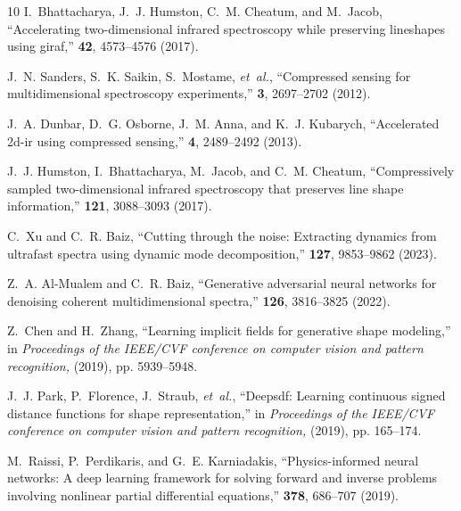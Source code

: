 \documentclass{optica-article}
\begin{document}
\begin{thebibliography}{10}
I.~Bhattacharya, J.~J. Humston, C.~M. Cheatum, and M.~Jacob, \enquote{Accelerating two-dimensional infrared spectroscopy while preserving lineshapes using giraf,} {\protect{}} \textbf{42}, 4573--4576 (2017).

J.~N. Sanders, S.~K. Saikin, S.~Mostame, \emph{et~al.}, \enquote{Compressed sensing for multidimensional spectroscopy experiments,} {\protect{}} \textbf{3}, 2697--2702 (2012).

J.~A. Dunbar, D.~G. Osborne, J.~M. Anna, and K.~J. Kubarych, \enquote{Accelerated 2d-ir using compressed sensing,} {\protect{}} \textbf{4}, 2489--2492 (2013).

J.~J. Humston, I.~Bhattacharya, M.~Jacob, and C.~M. Cheatum, \enquote{Compressively sampled two-dimensional infrared spectroscopy that preserves line shape information,} {\protect{}} \textbf{121}, 3088--3093 (2017).

C.~Xu and C.~R. Baiz, \enquote{Cutting through the noise: Extracting dynamics from ultrafast spectra using dynamic mode decomposition,} {\protect{}} \textbf{127}, 9853--9862 (2023).

Z.~A. Al-Mualem and C.~R. Baiz, \enquote{Generative adversarial neural networks for denoising coherent multidimensional spectra,} {\protect{}} \textbf{126}, 3816--3825 (2022).

Z.~Chen and H.~Zhang, \enquote{Learning implicit fields for generative shape modeling,} in \emph{Proceedings of the IEEE/CVF conference on computer vision and pattern recognition,}  (2019), pp. 5939--5948.

J.~J. Park, P.~Florence, J.~Straub, \emph{et~al.}, \enquote{Deepsdf: Learning continuous signed distance functions for shape representation,} in \emph{Proceedings of the IEEE/CVF conference on computer vision and pattern recognition,}  (2019), pp. 165--174.

M.~Raissi, P.~Perdikaris, and G.~E. Karniadakis, \enquote{Physics-informed neural networks: A deep learning framework for solving forward and inverse problems involving nonlinear partial differential equations,} {\protect{}} \textbf{378}, 686--707 (2019).


\end{thebibliography}
\end{document}
